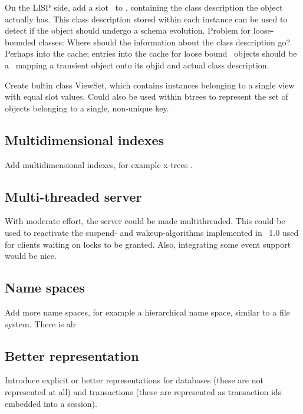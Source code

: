 On the LISP side, add a slot \ to
, containing the class description the
object actually has. This class description stored within each
instance can be used to detect if the object should undergo a schema
evolution.  Problem for loose-bounded classes: Where should the
information about the class description go? Perhaps into the cache;
entries into the cache for loose bound \clos\ objects should be a
\ mapping a transient object onto its objid and actual
class description.

Create bultin class ViewSet, which contains instances belonging to a
single view with equal slot values. Could also be used within btrees
to represent the set of objects belonging to a single, non-unique key.

\subsection{Multidimensional indexes}

Add multidimensional indexes, for example x-trees
\cite{bib:Berchtold-et-al-96,bib:Beckmann-et-al-90}.

\subsection{Multi-threaded server}

With moderate effort, the server could be made multithreaded. This
could be used to reactivate the suspend- and wakeup-algorithms
implemented in \plob\ 1.0 used for clients waiting on locks to be
granted. Also, integrating some event support would be nice.

\subsection{Name spaces}

Add more name spaces, for example a hierarchical name space, similar
to a file system. There is alr

\subsection{Better representation}

Introduce explicit or better representations for databases (these are
not represented at all) and transactions (these are represented as
transaction ids embedded into a session).

